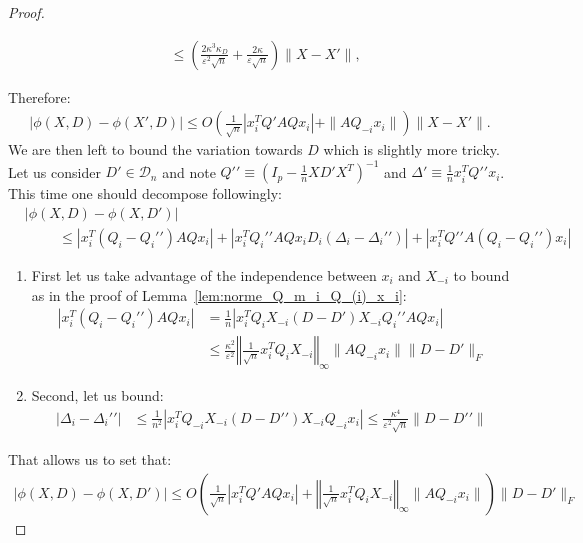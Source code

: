 \documentclass[a4papaer, titlepage]{book}
\begin{document}
\begin{proof}
\begin{enumerate}
\begin{align*}
     &\leq \left( \frac{2\kappa^3\kappa_D}{\varepsilon^2\sqrt n} + \frac{2\kappa}{\varepsilon\sqrt n} \right) \|X-X'\|,
   \end{align*}
   \end{enumerate}
   Therefore:
   \begin{align*}
     \left\vert \phi(X,D) - \phi(X',D) \right\vert
     \leq O \left( \frac{1 }{\sqrt n}\left\vert x_i^TQ'AQx_i \right\vert  + \|AQ_{-i}x_i\|\right)\|X-X'\|.
   \end{align*}
   We are then left to bound the variation towards $D$ which is slightly more tricky. Let us consider $D' \in \mathcal D_n$ and note $Q'{}' \equiv(I_p - \frac{1}{n}XD'X^T)^{-1}$ and $\Delta' \equiv \frac{1}{n}x_i^TQ'{}'x_i$. This time one should decompose followingly:
   \begin{align*}
     &\left\vert \phi(X,D) - \phi(X,D') \right\vert \\
    &\hspace{1cm} \leq \left\vert x_i^T(Q_{i}-Q_{i}'{}')AQx_i \right\vert + \left\vert x_i^TQ_{i}'{}'AQx_i D_i (\Delta_i - \Delta_i'{}')\right\vert + \left\vert x_i^TQ'{}'A(Q_{i}-Q_{i}'{}')x_i \right\vert
   \end{align*}
   \begin{enumerate}
     \item First let us take advantage of the independence between $x_i$ and $X_{-i}$ to bound as in the proof of Lemma~\ref{lem:norme_Q_m_i_Q_(i)_x_i}:
   \begin{align*}
     \left\vert x_i^T(Q_{i}-Q_{i}'{}')AQx_i \right\vert
     & = \frac{1}{n}\left\vert x_i^TQ_{i}X_{-i} (D-D')X_{-i}Q_{i}'{}'AQx_i \right\vert\\
     &\leq \frac{\kappa^2 }{\varepsilon^2}\left\Vert  \frac{1}{\sqrt n}x_i^TQ_{i}X_{-i} \right\Vert_\infty \|AQ_{-i}x_i\| \|D-D'\|_F
   \end{align*}
   \item Second, let us bound:
   \begin{align*}
     \left\vert \Delta_i - \Delta_i'{}' \right\vert 
     &\leq  \frac{1}{n^2}\left\vert x_i^TQ_{-i}X_{-i}(D-D'{}')X_{-i}Q_{-i} x_i \right\vert 
     \leq \frac{\kappa^4}{\varepsilon^2\sqrt n}  \|D-D'{}'\|
   \end{align*}
   \end{enumerate}
   That allows us to set that:
   \begin{align*}
     \left\vert \phi(X,D) - \phi(X,D') \right\vert \leq O \left( \frac{1 }{\sqrt n}\left\vert x_i^TQ'AQx_i \right\vert +  \left\Vert  \frac{1}{\sqrt n}x_i^TQ_{i}X_{-i} \right\Vert_\infty \|AQ_{-i}x_i\| \right) \|D-D'\|_F

\end{align*}
\end{proof}
\end{document}
